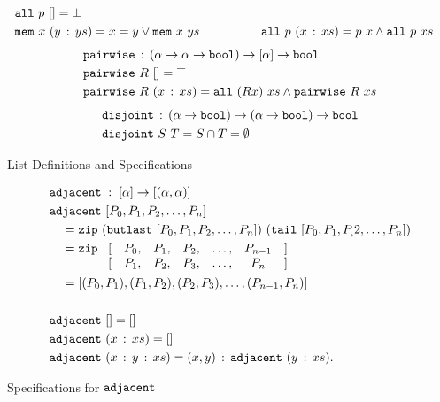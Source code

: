 \begin{boxedfigure}
\begin{align*}
  & \texttt{all}\ p\ [] = \bot\\
  & \texttt{mem}\ x\ (y\,:\,ys) = x = y \vee \texttt{mem}\ x\ ys &\qquad\qquad
  & \texttt{all}\ p\ (x\,:\,xs) = p\ x \wedge \texttt{all}\ p\ xs   
\end{align*}
\begin{align*}
  & \texttt{pairwise}\,:\,(\alpha \rightarrow \alpha \rightarrow \texttt{bool}) \rightarrow [\alpha] \rightarrow \texttt{bool}\\
  & \texttt{pairwise}\ R\ [] = \top\\
  & \texttt{pairwise}\ R\ (x\,:\,xs) = \texttt{all}\ (R x)\ xs \wedge \texttt{pairwise}\ R\ xs
\end{align*}
\begin{align*}
  & \texttt{disjoint}\,:\,(\alpha\rightarrow\texttt{bool})\rightarrow(\alpha\rightarrow\texttt{bool})\rightarrow\texttt{bool}\\
  & \texttt{disjoint}\ S\ T = S \cap T = \emptyset
\end{align*}
\caption{List Definitions and Specifications}
\label{fig:ListDefinitions}
\end{boxedfigure}

\begin{boxedfigure}
\small
\begin{align*}
  &\code{adjacent}\; : \; [\alpha] \rightarrow [(\alpha,\alpha)]\\
  &\code{adjacent}\ [P_0,P_1,P_2,\ldots,P_n]\\
  &\quad=\code{zip}\ (\code{butlast}\ [P_0,P_1,P_2,\ldots,P_n])\ (\code{tail}\ [P_0,P_1,P_,2,\ldots,P_n])\\
  &\quad= \code{zip}\ \begin{array}[t]{rcccccl}\lbrack & P_0,&P_1,&P_2,&\ldots,&P_{n-1}&\rbrack\\
    \lbrack & P_1,&P_2,&P_3,&\ldots,&P_n&\rbrack
  \end{array}\\
  &\quad= [(P_0,P_1),(P_1,P_2),(P_2,P_3),\ldots,(P_{n-1},P_n)]\\\\
  &\code{adjacent}\ [] = []\\
  &\code{adjacent}\ (\cons{x}{xs}) = []\\
  &\code{adjacent}\ (\cons{x}{\cons{y}{xs}}) = \cons{(x,y)}{\code{adjacent}\ (\cons{y}{xs})}.
\end{align*}
\caption{Specifications for $\texttt{adjacent}$}
\label{fig:AdjacentSpec}
\end{boxedfigure}

